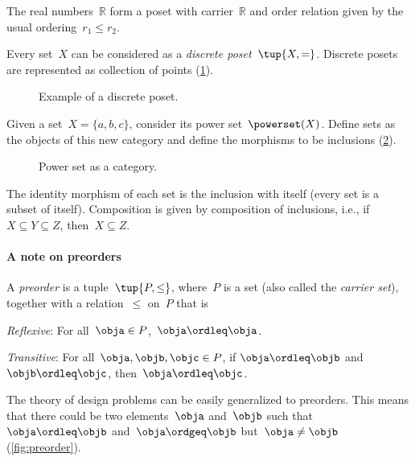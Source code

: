 \begin{example}[Reals]
  The real numbers~$\mathbb{R}$ form a poset with carrier~$\mathbb{R}$ and order relation given by the usual ordering~$r_1 \leq r_2$.
\end{example}

\begin{example}
  \label{ex:discreteposet}
  Every set~$X$ can be considered as a \emph{discrete poset}~$\tup{X,=}$. Discrete posets are represented as collection of points (\cref{fig:discretepos}).

  \begin{figure}[tbh]
    \centering
    \caption{Example of a discrete poset. \label{fig:discretepos}}
  \end{figure}

  \begin{example}
    \label{ex:hasseinclusion}
    Given a set~$X=\{a,b,c\}$, consider its power set~$\powerset(X)$. Define sets as the objects of this new category and define the morphisms to be inclusions (\cref{fig:powersetcat}).

    \begin{figure}[h!]
      \begin{center}
      \end{center}
      \caption{Power set as a category. \label{fig:powersetcat}}
    \end{figure}

    The identity morphism of each set is the inclusion with itself (every set is a subset of itself). Composition is given by composition of inclusions, i.e., if~$X\subseteq Y \subseteq Z$, then~$X\subseteq Z$.
  \end{example}
\end{example}

\paragraph{A note on preorders}
\begin{definition}[Preorder]
  \label{def:preorder}
  A \emph{preorder} is a tuple~$\tup{P, \leq}$,
  where~$P$ is a set (also called the \emph{carrier set}), together with a
  relation~$\leq$ on~$P$ that is
  \begin{compactenum}
    \item \emph{Reflexive}: For all~$\obja\in P$,~$\obja\ordleq \obja$.
    \item \emph{Transitive}: For all~$\obja,\objb,\objc\in P$, if $\obja\ordleq \objb$ and~$\objb\ordleq \objc$, then~$\obja\ordleq \objc$.
  \end{compactenum}
\end{definition}
The theory of design problems can be easily generalized to preorders. This means that there could be two elements~$\obja$ and~$\objb$ such that~$\obja\ordleq \objb$ and~$\obja \ordgeq \objb$ but~$\obja \neq \objb$ (\cref{fig:preorder}).

